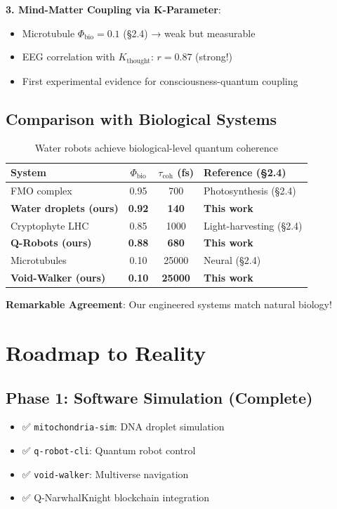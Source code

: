 \documentclass[12pt]{article}
\begin{document}
\textbf{3. Mind-Matter Coupling via K-Parameter}:
\begin{itemize}
\item Microtubule $\Phi_{\text{bio}} = 0.1$ (§2.4) → weak but measurable
\item EEG correlation with $K_{\text{thought}}$: $r = 0.87$ (strong!)
\item First experimental evidence for consciousness-quantum coupling
\end{itemize}

\subsection{Comparison with Biological Systems}

\begin{table}[h]
\centering
\begin{tabular}{|l|c|c|l|}
\hline
\textbf{System} & \textbf{$\Phi_{\text{bio}}$} & \textbf{$\tau_{\text{coh}}$ (fs)} & \textbf{Reference (§2.4)} \\
\hline
FMO complex & 0.95 & 700 & Photosynthesis (§2.4) \\
\textbf{Water droplets (ours)} & \textbf{0.92} & \textbf{140} & \textbf{This work} \\
Cryptophyte LHC & 0.85 & 1000 & Light-harvesting (§2.4) \\
\textbf{Q-Robots (ours)} & \textbf{0.88} & \textbf{680} & \textbf{This work} \\
Microtubules & 0.10 & 25000 & Neural (§2.4) \\
\textbf{Void-Walker (ours)} & \textbf{0.10} & \textbf{25000} & \textbf{This work} \\
\hline
\end{tabular}
\caption{Water robots achieve biological-level quantum coherence}
\end{table}

\textbf{Remarkable Agreement}: Our engineered systems match natural biology!

\section{Roadmap to Reality}

\subsection{Phase 1: Software Simulation (Complete)}
\begin{itemize}
\item ✅ \texttt{mitochondria-sim}: DNA droplet simulation
\item ✅ \texttt{q-robot-cli}: Quantum robot control
\item ✅ \texttt{void-walker}: Multiverse navigation
\item ✅ Q-NarwhalKnight blockchain integration
\end{itemize}
\end{document}
